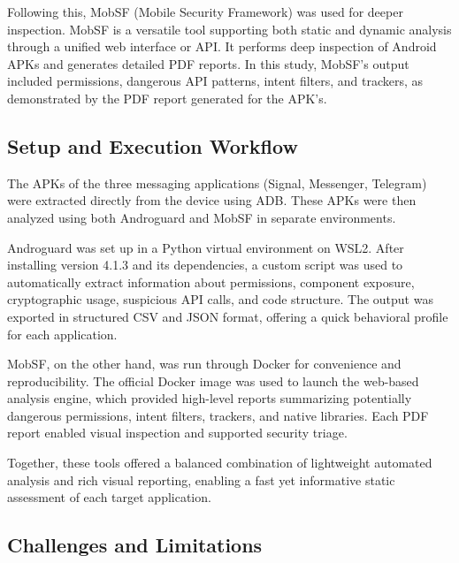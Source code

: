 \documentclass[a4paper,12pt]{report}
\begin{document}
Following this, MobSF (Mobile Security Framework) was used for deeper inspection. MobSF is a versatile tool supporting both static and dynamic analysis through a unified web interface or API. It performs deep inspection of Android APKs and generates detailed PDF reports. In this study, MobSF's output included permissions, dangerous API patterns, intent filters, and trackers, as demonstrated by the PDF report generated for the APK's.

\subsection{Setup and Execution Workflow}

The APKs of the three messaging applications (Signal, Messenger, Telegram) were extracted directly from the device using ADB. These APKs were then analyzed using both Androguard and MobSF in separate environments.

Androguard was set up in a Python virtual environment on WSL2. After installing version 4.1.3 and its dependencies, a custom script was used to automatically extract information about permissions, component exposure, cryptographic usage, suspicious API calls, and code structure. The output was exported in structured CSV and JSON format, offering a quick behavioral profile for each application.

MobSF, on the other hand, was run through Docker for convenience and reproducibility. The official Docker image was used to launch the web-based analysis engine, which provided high-level reports summarizing potentially dangerous permissions, intent filters, trackers, and native libraries. Each PDF report enabled visual inspection and supported security triage.

Together, these tools offered a balanced combination of lightweight automated analysis and rich visual reporting, enabling a fast yet informative static assessment of each target application.


\subsection{Challenges and Limitations}
\end{document}
